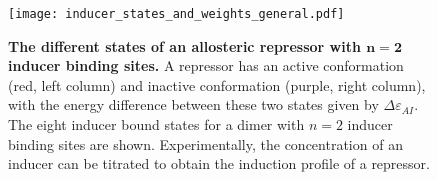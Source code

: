 \begin{figure}[h]
	\centering \texttt{[image: inducer\_states\_and\_weights\_general.pdf]}
	\caption{{\bf The different states of an allosteric repressor with
			$\boldsymbol{n=2}$ inducer binding sites.}   A
		repressor has an active conformation (red, left column) and inactive
		conformation (purple, right column), with the energy difference between these
		two states given by $\Delta \varepsilon_{AI}$. The eight inducer bound states
		for a dimer with $n=2$ inducer binding sites are shown. 
		 Experimentally, the
		concentration of an inducer can be titrated to obtain the induction profile of
		a repressor. } \label{figrepressorInducerStates}
\end{figure}

